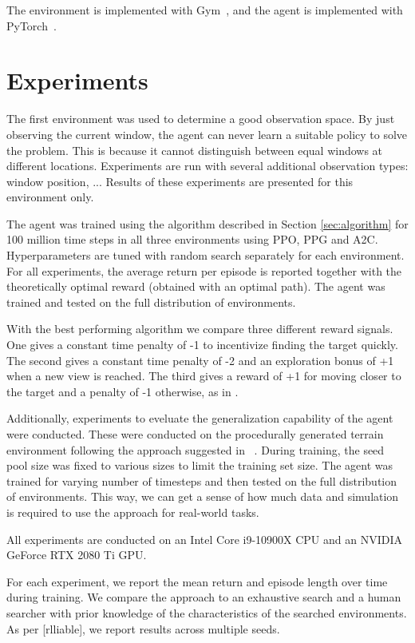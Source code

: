 The environment is implemented with Gym~\cite{gym}, and the agent is implemented with PyTorch~\cite{pytorch}. 


\section{Experiments}

The first environment was used to determine a good observation space.
By just observing the current window, the agent can never learn a suitable policy to solve the problem.
This is because it cannot distinguish between equal windows at different locations.
Experiments are run with several additional observation types: window position, ...
Results of these experiments are presented for this environment only.

The agent was trained using the algorithm described in Section \ref{sec:algorithm} for 100 million time steps in all three environments using PPO, PPG and A2C.
Hyperparameters are tuned with random search separately for each environment.
For all experiments, the average return per episode is reported together with the theoretically optimal reward (obtained with an optimal path).
The agent was trained and tested on the full distribution of environments.

With the best performing algorithm we compare three different reward signals.
One gives a constant time penalty of -1 to incentivize finding the target quickly.
The second gives a constant time penalty of -2 and an exploration bonus of +1 when a new view is reached.
The third gives a reward of +1 for moving closer to the target and a penalty of -1 otherwise, as in \cite{caicedo_active_2015}.

Additionally, experiments to eveluate the generalization capability of the agent were conducted.
These were conducted on the procedurally generated terrain environment following the approach suggested in ~\cite{procgen}.
During training, the seed pool size was fixed to various sizes to limit the training set size.
The agent was trained for varying number of timesteps and then tested on the full distribution of environments.
This way, we can get a sense of how much data and simulation is required to use the approach for real-world tasks.

All experiments are conducted on an Intel Core i9-10900X CPU and an NVIDIA GeForce RTX 2080 Ti GPU.

For each experiment, we report the mean return and episode length over time during training.
We compare the approach to an exhaustive search and a human searcher with prior knowledge of the characteristics of the searched environments.
As per [rlliable], we report results across multiple seeds.

